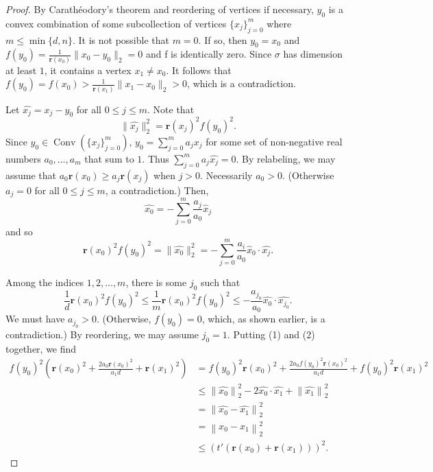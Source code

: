 \documentclass{amsart}
\newtheorem*{fibering lemma}{Fibering Lemma}
\newtheorem*{decomposition lemma}{Decomposition Lemma}
\newtheorem*{hurewicz theorem}{Hurewicz Theorem}
\theoremstyle{definition}
\DeclareMathOperator{\Conv}{Conv}
\begin{document}
\begin{proof}
By Carath\'{e}odory's theorem \cite{Matousek} and reordering of vertices if necessary, $y_0$ is a convex combination of some subcollection of vertices $\{x_j\}_{j=0}^{m}$ where $m \leq \min\{d,n\}$. It is not possible that $m = 0$. If so, then $y_0 = x_0$ and $f(y_0) = \frac{1}{\mathbf{r}(x_0)}\|x_0 - y_0\|_2 = 0$ and f is identically zero. Since $\sigma$ has dimension at least $1$, it contains a vertex $x_1 \neq x_0$. It follows that $f(y_0) = f(x_0) > \frac{1}{\mathbf{r}(x_1)} \|x_1 - x_0\|_2 > 0$, which is a contradiction. 
		
Let $\widehat{x_j} = x_j - y_0$ for all $0 \leq j \leq m$. Note that 
\begin{equation}
\|\widehat{x_j}\|_2^2 = \mathbf{r}(x_j)^2 f(y_0)^2.
\end{equation} 
Since $y_0 \in \Conv(\{x_j\}_{j=0}^m)$, $y_0 = \sum_{j=0}^{m} a_j x_j$ for some set of non-negative real numbers $a_0,\ldots, a_m$ that sum to $1$. Thus $\sum_{j=0}^{m} a_j \widehat{x_j}=0$. By relabeling, we may assume that $a_0 \mathbf{r}(x_0) \ge a_j\mathbf{r}(x_j)$ when $j > 0$. Necessarily $a_0 >0$. (Otherwise $a_j = 0$ for all $0 \leq j \leq m$, a contradiction.) Then, \[\widehat{x_0} = -\sum\limits_{j=0}^{m} \frac{a_j}{a_0} \widehat{x}_j\] and so \[\mathbf{r}(x_0)^2 f(y_0)^2 = \|\widehat{x_0}\|_2^2 = - \sum\limits_{j=0}^{m} \frac{a_i}{a_0} \widehat{x}_0 \cdot \widehat{x_j}.\]
		
Among the indices $1,2,\ldots,m$, there is some $j_0$ such that
\begin{equation}
\frac{1}{d} \mathbf{r}(x_0)^2 f(y_0)^2 \leq \frac{1}{m} \mathbf{r}(x_0)^2 f(y_0)^2 \leq -\frac{a_{j_0}}{a_0} \widehat{x_0} \cdot \widehat{x_{j_0}}.
\end{equation}
We must have $a_{j_0}>0$.  (Otherwise, $f(y_0) = 0$, which, as shown earlier, is a contradiction.)
By reordering, we may assume $j_0 = 1$.
Putting (1) and (2) together, we find 
\begin{align*}
f(y_0)^2 \left( \mathbf{r}(x_0)^2 + \frac{2 a_0 \mathbf{r}(x_0)^2}{a_1 d} + \mathbf{r}(x_{1})^2\right) & = f(y_0)^2\mathbf{r}(x_0)^2+\frac{2a_0f(y_0)^2\mathbf{r}(x_0)^2}{a_1d}+f(y_0)^2\mathbf{r}(x_1)^2 \\
&\leq \left\|\widehat{x_0}\right\|_2^2 - 2 \widehat{x_0} \cdot \widehat{x_1} + \left\|				\widehat{x_1}\right\|_2^2 \\
			&= \left\|\widehat{x_0} - \widehat{x_1}\right\|_2^2 \\
			&= \left\|x_0 - x_1\right\|_2^2 \\
			&\leq \left(t' \left(\mathbf{r}(x_0)+\mathbf{r}(x_1)\right)\right)^2.
\end{align*}


\end{proof}
\end{document}
